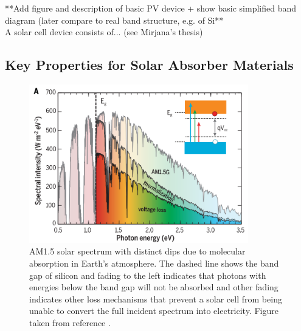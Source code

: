 **Add figure and description of basic PV device + show basic simplified band diagram (later compare to real band structure, e.g. of Si**\\

A solar cell device consists of... (see Mirjana's thesis)

\subsection{Key Properties for Solar Absorber Materials}\label{PV_properties}

\begin{figure}[h!]
  \centering
    \includegraphics[width=0.85\textwidth]{figures/solar_spectrum2.png}
    \caption{AM1.5 solar spectrum with distinct dips due to molecular absorption in Earth’s atmosphere. The dashed line shows the band gap of silicon and fading to the left indicates that photons with energies below the band gap will not be absorbed and other fading indicates other loss mechanisms that prevent a solar cell from being unable to convert the full incident spectrum into electricity. Figure taken from reference .}
  \label{solar_spectrum}
\end{figure}

